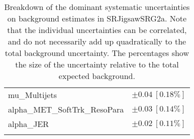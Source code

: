 \begin{table}
\begin{center}
\begin{tabular*}{\textwidth}{@{\extracolsep{\fill}}lc}
mu\_Multijets         & $\pm 0.04\ [0.18\%] $       \\
alpha\_MET\_SoftTrk\_ResoPara         & $\pm 0.03\ [0.14\%] $       \\
alpha\_JER         & $\pm 0.02\ [0.11\%] $       \\
\noalign{\smallskip}\hline\noalign{\smallskip}
\end{tabular*}
\end{center}
\caption[Breakdown of uncertainty on background estimates]{
Breakdown of the dominant systematic uncertainties on background estimates in SRJigsawSRG2a.
Note that the individual uncertainties can be correlated, and do not necessarily add up quadratically to 
the total background uncertainty. The percentages show the size of the uncertainty relative to the total expected background.
\label{table.results.bkgestimate.uncertainties.SRJigsawSRG2a}}
\end{table}
%